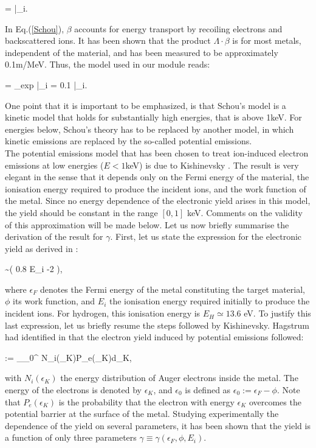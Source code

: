 \beq
\gamma = \Lambda \cdot \beta \cdot  {}\Bigg|_i.\label{Schou}
\eeq

\noindent In Eq.(\ref{Schou}), $\beta$ accounts for energy transport by recoiling electrons and backscattered ions. It has been shown that the product $\Lambda\cdot\beta$ is for most metals, independent of the material, and has been measured to be approximately 0.1m/MeV. Thus, the model used in our module reads:

\beq
\gamma = \Lambda_{exp} \cdot  {}\Bigg|_i = 0.1 \cdot  {}\Bigg|_i.
\eeq

\noindent One point that it is important to be emphasized, is that Schou's model is a kinetic model that holds for substantially high energies, that is above 1keV. For energies below, Schou's theory has to be replaced by another model, in which kinetic emissions are replaced by the so-called potential emissions.\\

The potential emissions model that has been chosen to treat ion-induced electron emissions at low energies ($E<1$keV) is due to Kishinevsky \cite{Kishi73}. The result is very elegant in the sense that it depends only on the Fermi energy of the material, the ionisation energy required to produce the incident ions, and the work function of the metal. Since no energy dependence of the electronic yield arises in this model, the yield should be constant in the range $[0,1]$ keV. Comments on the validity of this approximation will be made below. Let us now briefly summarise the derivation of the result for $\gamma$. First, let us state the expression for the electronic yield as derived in \cite{Kishi73}: 

\beq
\gamma \sim {}\big( 0.8 \cdot E_i -2 \phi \big),\label{pot_em}
\eeq

\noindent where $\epsilon_F$ denotes the Fermi energy of the metal constituting the target material, $\phi$ its work function, and $E_i$ the ionisation energy required initially to produce the incident ions. For hydrogen, this ionisation energy is $E_H \simeq 13.6$ eV. To justify this last expression, let us briefly resume the steps followed by Kishinevsky. Hagstrum had identified in \cite{Hagstrum} that the electron yield induced by potential emissions followed: 

\beq
\gamma := \int_{\epsilon_0}^{\infty} N_i(\epsilon_K)P_e(\epsilon_K)d\epsilon_K,
\eeq

with $N_i(\epsilon_K)$ the energy distribution of Auger electrons inside the metal. The energy of the electrons is denoted by $\epsilon_K$, and $\epsilon_0$ is defined as $\epsilon_0:=\epsilon_F-\phi$. Note that $P_e(\epsilon_K)$ is the probability that the electron with energy $\epsilon_K$ overcomes the potential barrier at the surface of the metal. Studying experimentally the dependence of the yield on several parameters, it has been shown that the yield is a function of only three parameters $\gamma \equiv \gamma(\epsilon_F, \phi, E_i)$.\\


